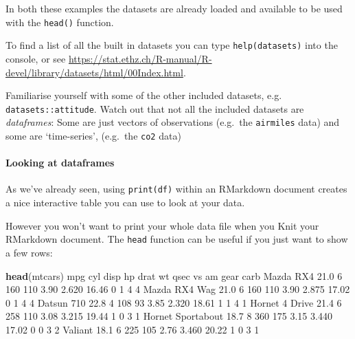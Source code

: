 \documentclass[]{article}
\newenvironment{Shaded}{\begin{snugshade}}{\end{snugshade}}
\newcommand{\DecValTok}[1]{\textcolor[rgb]{0.00,0.00,0.81}{#1}}
\newcommand{\FloatTok}[1]{\textcolor[rgb]{0.00,0.00,0.81}{#1}}
\newcommand{\KeywordTok}[1]{\textcolor[rgb]{0.13,0.29,0.53}{\textbf{#1}}}
\newcommand{\NormalTok}[1]{#1}
\let\oldparagraph\paragraph
\renewcommand{\paragraph}[1]{\oldparagraph{#1}\mbox{}}
\begin{document}
In both these examples the datasets are already loaded and available to be used
with the \texttt{head()} function.

To find a list of all the built in datasets you can type \texttt{help(datasets)} into
the console, or see
\url{https://stat.ethz.ch/R-manual/R-devel/library/datasets/html/00Index.html}.

Familiarise yourself with some of the other included datasets, e.g.
\texttt{datasets::attitude}. Watch out that not all the included datasets are
\emph{dataframes}: Some are just vectors of observations (e.g.~the \texttt{airmiles} data)
and some are `time-series', (e.g.~the \texttt{co2} data)

\hypertarget{looking-at-data}{%
\paragraph{Looking at dataframes}\label{looking-at-data}}

As we've already seen, using \texttt{print(df)} within an RMarkdown document creates a
nice interactive table you can use to look at your data.

However you won't want to print your whole data file when you Knit your
RMarkdown document. The \texttt{head} function can be useful if you just want to show a
few rows:

\begin{Shaded}
\begin{Highlighting}[]
\KeywordTok{head}\NormalTok{(mtcars)}
\NormalTok{                   mpg cyl disp  hp drat    wt  qsec vs am gear carb}
\NormalTok{Mazda RX4         }\FloatTok{21.0}   \DecValTok{6}  \DecValTok{160} \DecValTok{110} \FloatTok{3.90} \FloatTok{2.620} \FloatTok{16.46}  \DecValTok{0}  \DecValTok{1}    \DecValTok{4}    \DecValTok{4}
\NormalTok{Mazda RX4 Wag     }\FloatTok{21.0}   \DecValTok{6}  \DecValTok{160} \DecValTok{110} \FloatTok{3.90} \FloatTok{2.875} \FloatTok{17.02}  \DecValTok{0}  \DecValTok{1}    \DecValTok{4}    \DecValTok{4}
\NormalTok{Datsun }\DecValTok{710}        \FloatTok{22.8}   \DecValTok{4}  \DecValTok{108}  \DecValTok{93} \FloatTok{3.85} \FloatTok{2.320} \FloatTok{18.61}  \DecValTok{1}  \DecValTok{1}    \DecValTok{4}    \DecValTok{1}
\NormalTok{Hornet }\DecValTok{4}\NormalTok{ Drive    }\FloatTok{21.4}   \DecValTok{6}  \DecValTok{258} \DecValTok{110} \FloatTok{3.08} \FloatTok{3.215} \FloatTok{19.44}  \DecValTok{1}  \DecValTok{0}    \DecValTok{3}    \DecValTok{1}
\NormalTok{Hornet Sportabout }\FloatTok{18.7}   \DecValTok{8}  \DecValTok{360} \DecValTok{175} \FloatTok{3.15} \FloatTok{3.440} \FloatTok{17.02}  \DecValTok{0}  \DecValTok{0}    \DecValTok{3}    \DecValTok{2}
\NormalTok{Valiant           }\FloatTok{18.1}   \DecValTok{6}  \DecValTok{225} \DecValTok{105} \FloatTok{2.76} \FloatTok{3.460} \FloatTok{20.22}  \DecValTok{1}  \DecValTok{0}    \DecValTok{3}    \DecValTok{1}
\end{Highlighting}
\end{Shaded}
\end{document}
